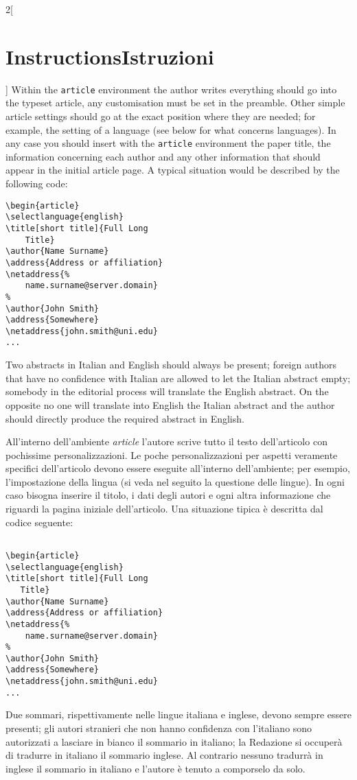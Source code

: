 \documentclass[12pt]{article}
\providecommand\amb[1]{\textnormal{\slshape#1}}
\providecommand\italian{\selectlanguage{italian}}
\begin{document}
\begin{paracol}{2}[\section{Instructions\hspace{5.6em}Istruzioni}]
Within the \texttt{article} environment the author writes everything should go into the typeset article, any customisation must  be set in the preamble. Other simple article settings should go at the exact position where they are needed; for example, the setting of a language (see below for what concerns languages). In any case you should insert with the \texttt{article} environment the paper title, the information concerning each author and any other information that should appear in the initial article page. A typical situation would be described by the following code:
\begin{verbatim}
\begin{article}
\selectlanguage{english}
\title[short title]{Full Long 
    Title}
\author{Name Surname}
\address{Address or affiliation}
\netaddress{%
    name.surname@server.domain}
%
\author{John Smith}
\address{Somewhere}
\netaddress{john.smith@uni.edu}
...
\end{verbatim}
Two abstracts in Italian and English should always be present; foreign authors that have no confidence with Italian are allowed to let the Italian abstract empty; somebody in the editorial process will translate the English abstract. On the opposite no one will translate into English the Italian abstract and the author should directly produce the required abstract in English.

\italian

All'interno dell'ambiente \amb{article} l'autore scrive tutto il testo dell'articolo con pochissime personalizzazioni. Le poche personalizzazioni per aspetti veramente specifici dell'articolo devono essere eseguite all'interno  dell'ambiente; per esempio, l'impostazione della lingua (si veda nel seguito la questione delle lingue). In ogni caso bisogna inserire il titolo, i dati degli autori e ogni altra informazione che riguardi la pagina iniziale dell'articolo. Una situazione tipica è descritta dal codice seguente:
\begin{verbatim}

\begin{article}
\selectlanguage{english}
\title[short title]{Full Long 
   Title}
\author{Name Surname}
\address{Address or affiliation}
\netaddress{%
    name.surname@server.domain}
%
\author{John Smith}
\address{Somewhere}
\netaddress{john.smith@uni.edu}
...
\end{verbatim}
Due sommari, rispettivamente nelle lingue italiana e inglese, devono sempre essere presenti; gli autori stranieri che non hanno confidenza con l'italiano sono autorizzati a lasciare in bianco il sommario in italiano; la Redazione si occuperà di tradurre in italiano il sommario inglese. Al contrario nessuno tradurrà in inglese il sommario in italiano e l'autore è tenuto a comporselo da solo.


\end{paracol}
\end{document}
